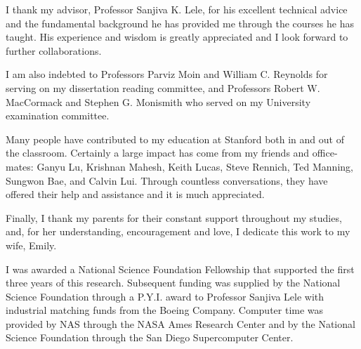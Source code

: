 %
%
%
%
%

I thank my advisor, Professor Sanjiva K. Lele, for his excellent technical
advice and the fundamental background he has provided me through the courses
he has taught.  His experience and wisdom is greatly appreciated and I look
forward to further collaborations.

I am also indebted to Professors Parviz Moin and William C. Reynolds for
serving on my dissertation reading committee, and Professors Robert
W. MacCormack and Stephen G. Monismith who served on my University examination
committee.

Many people have contributed to my education at Stanford both in and out of
the classroom.  Certainly a large impact has come from my friends and
office-mates: Ganyu Lu, Krishnan Mahesh, Keith Lucas, Steve Rennich, Ted
Manning, Sungwon Bae, and Calvin Lui.  Through countless conversations, they
have offered their help and assistance and it is much appreciated.

Finally, I thank my parents for their constant support throughout my studies,
and, for her understanding, encouragement and love, I dedicate this work to my
wife, Emily.

\vskip 1.0in

I was awarded a National Science Foundation Fellowship that supported the
first three years of this research.  Subsequent funding was supplied by the
National Science Foundation through a P.Y.I. award to Professor Sanjiva Lele
with industrial matching funds from the Boeing Company.  Computer time was
provided by NAS through the NASA Ames Research Center and by the National
Science Foundation through the San Diego Supercomputer Center.


